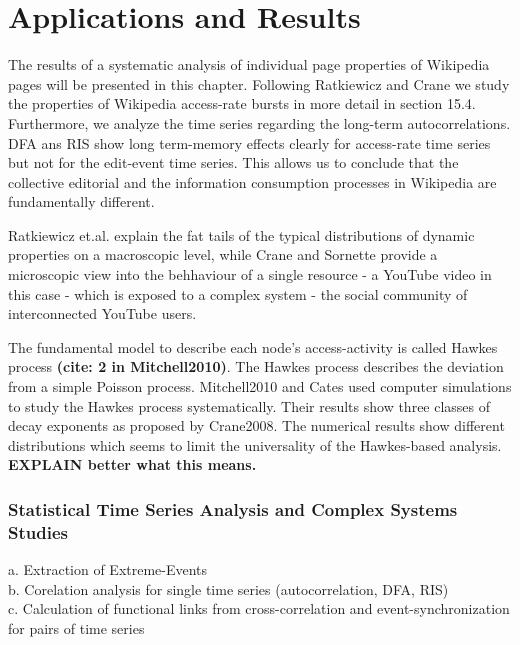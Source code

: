 \documentclass[a4paper,10pt]{scrbook}
\begin{document}


\part{Applications and Results}

The results of a systematic analysis of individual page properties of Wikipedia pages will be presented in this chapter. Following Ratkiewicz and Crane we study the properties of Wikipedia access-rate bursts in more detail in section 15.4. Furthermore, we analyze the time series regarding the long-term autocorrelations. DFA ans RIS show long term-memory effects clearly for access-rate time series but not for the edit-event time series. This allows us to conclude that the collective editorial and the information consumption processes in Wikipedia are fundamentally different.

Ratkiewicz et.al. explain the fat tails of the typical distributions of dynamic properties on a macroscopic level, while Crane and Sornette provide a microscopic view into the behhaviour of a single resource - a YouTube video in this case - which is exposed to a complex system - the social community of interconnected YouTube users.

The fundamental model to describe each node's access-activity is called Hawkes process \textbf{(cite: 2 in Mitchell2010)}. The Hawkes process describes the deviation from a simple Poisson process. Mitchell2010 and Cates used computer simulations to study the Hawkes process systematically.
Their results show three classes of decay exponents as proposed by Crane2008. The numerical results show different distributions which seems to limit the universality of  the Hawkes-based analysis. \textbf{EXPLAIN better what this means.}

\section*{Statistical Time Series Analysis and Complex Systems Studies}
a. Extraction of Extreme-Events \\
b. Corelation analysis for single time series (autocorrelation, DFA, RIS)\\
c. Calculation of functional links from cross-correlation and event-synchronization for pairs of time series\\
\end{document}
